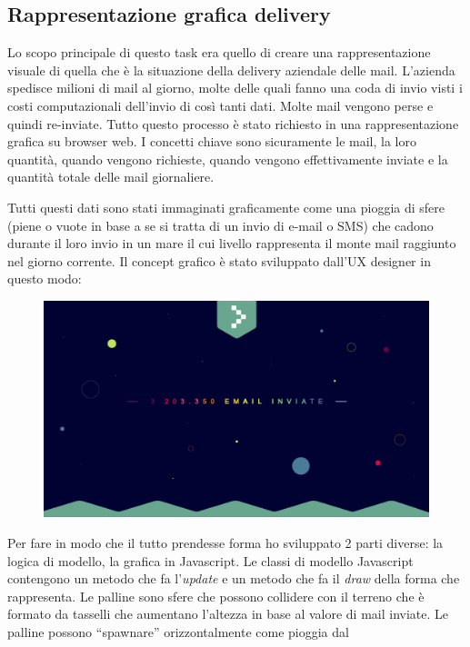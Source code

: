 \documentclass[a4paper]{article}
\begin{document}
\subsection{Rappresentazione grafica delivery}
\par Lo scopo principale di questo task era quello di creare una rappresentazione visuale
di quella che è la situazione della delivery aziendale delle mail. L'azienda spedisce
milioni di mail al giorno, molte delle quali fanno una coda di invio visti i costi 
computazionali dell'invio di così tanti dati. Molte mail vengono perse e quindi re-inviate.
Tutto questo processo è stato richiesto in una rappresentazione grafica su browser web.
I concetti chiave sono sicuramente le mail, la loro quantità, quando vengono richieste, quando
vengono effettivamente inviate e la quantità totale delle mail giornaliere.
\par Tutti questi dati sono stati immaginati graficamente come una pioggia di sfere (piene o vuote
in base a se si tratta di un invio di e-mail o SMS) che cadono durante il loro invio in un mare il cui
livello rappresenta il monte mail raggiunto nel giorno corrente. Il concept grafico è stato sviluppato
dall'UX designer in questo modo:
\begin{figure}[H]
	\includegraphics[width=\textwidth]{Monitor.jpg}
	\centering
\end{figure}
\par Per fare in modo che il tutto prendesse forma ho sviluppato 2 parti diverse: la logica di modello,
la grafica in Javascript. Le classi di modello Javascript contengono un metodo che fa l'\emph{update}
e un metodo che fa il \emph{draw} della forma che rappresenta. Le palline sono sfere che possono 
collidere con il terreno che è formato da tasselli che aumentano l'altezza in base al 
valore di mail inviate. Le palline possono ``spawnare'' orizzontalmente come pioggia dal
\end{document}
